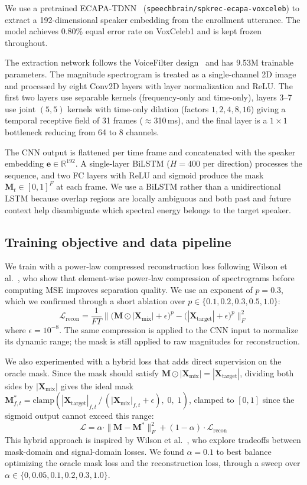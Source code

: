 \documentclass{article}
\begin{document}
We use a pretrained ECAPA-TDNN~\citep{ECAPA} (\texttt{speechbrain/spkrec-ecapa-voxceleb}) to extract a 192-dimensional speaker embedding from the enrollment utterance. The model achieves 0.80\% equal error rate on VoxCeleb1 and is kept frozen throughout.

The extraction network follows the VoiceFilter design~\citep{VoiceFilter} and has 9.53M trainable parameters. The magnitude spectrogram is treated as a single-channel 2D image and processed by eight Conv2D layers with layer normalization and ReLU. The first two layers use separable kernels (frequency-only and time-only), layers 3--7 use joint $(5, 5)$ kernels with time-only dilation (factors $1, 2, 4, 8, 16$) giving a temporal receptive field of 31 frames ($\approx$310\,ms), and the final layer is a $1 \times 1$ bottleneck reducing from 64 to 8 channels.

The CNN output is flattened per time frame and concatenated with the speaker embedding $\mathbf{e} \in \mathbb{R}^{192}$. A single-layer BiLSTM ($H{=}400$ per direction) processes the sequence, and two FC layers with ReLU and sigmoid produce the mask $\mathbf{M}_t \in [0,1]^{F}$ at each frame. We use a BiLSTM rather than a unidirectional LSTM because overlap regions are locally ambiguous and both past and future context help disambiguate which spectral energy belongs to the target speaker.

\subsection{Training objective and data pipeline}

We train with a power-law compressed reconstruction loss following Wilson et al.~\citep{Wilson2018}, who show that element-wise power-law compression of spectrograms before computing MSE improves separation quality. We use an exponent of $p = 0.3$, which we confirmed through a short ablation over $p \in \{0.1, 0.2, 0.3, 0.5, 1.0\}$:
\[
    \mathcal{L}_{\text{recon}} = \frac{1}{FT} \bigl\| \bigl(\mathbf{M} \odot |\mathbf{X}_{\text{mix}}| + \epsilon\bigr)^{p} - \bigl(|\mathbf{X}_{\text{target}}| + \epsilon\bigr)^{p} \bigr\|_F^2
\]
where $\epsilon = 10^{-8}$. The same compression is applied to the CNN input to normalize its dynamic range; the mask is still applied to raw magnitudes for reconstruction.

We also experimented with a hybrid loss that adds direct supervision on the oracle mask. Since the mask should satisfy $\mathbf{M} \odot |\mathbf{X}_{\text{mix}}| = |\mathbf{X}_{\text{target}}|$, dividing both sides by $|\mathbf{X}_{\text{mix}}|$ gives the ideal mask $\mathbf{M}^{*}_{f,t} = \text{clamp}(|\mathbf{X}_{\text{target}}|_{f,t}\, /\, (|\mathbf{X}_{\text{mix}}|_{f,t} + \epsilon),\; 0,\; 1)$, clamped to $[0,1]$ since the sigmoid output cannot exceed this range:
\[
    \mathcal{L} = \alpha \cdot \|\mathbf{M} - \mathbf{M}^{*}\|_F^2 + (1 - \alpha) \cdot \mathcal{L}_{\text{recon}}
\]
This hybrid approach is inspired by Wilson et al.~\citep{Wilson2018}, who explore tradeoffs between mask-domain and signal-domain losses. We found $\alpha = 0.1$ to best balance optimizing the oracle mask loss and the reconstruction loss, through a sweep over $\alpha \in \{0, 0.05, 0.1, 0.2, 0.3, 1.0\}$.
\end{document}
